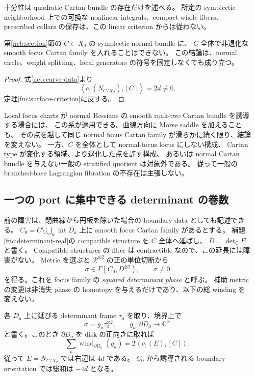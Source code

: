 十分性は quadratic Cartan bundle の存在だけを述べる。
所定の symplectic neighborhood 上での可換な nonlinear integrals、compact whole fibers、
prescribed collars の保存は、この linear criterion からは従わない。

\begin{corollary}\label{fnc:plane-section}
第\ref{ncb:section}節の $C\subset X_d$ の symplectic normal bundle に、
$C$ 全体で非退化な smooth focus Cartan family を入れることはできない。
この結論は、normal circle、weight splitting、local generators の符号を固定しなくても成り立つ。
\end{corollary}

\begin{proof}
式\eqref{ncb:curve-data}より
\[
 \left\langle c_1(N_{C/X_d}),[C]\right\rangle=2d\ne0.
\]
定理\ref{fnc:surface-criterion}に反する。
\end{proof}

Local focus charts が normal Hessians の smooth rank-two Cartan bundle を誘導する場合には、
この系が適用できる。曲線方向に Morse saddle を加えることも、
その点を越して同じ normal focus Cartan family が滑らかに続く限り、結論を変えない。
一方、$C$ を全体として normal-focus locus にしない構成、
Cartan type が変化する領域、より退化した点を許す構成、
あるいは normal Cartan bundle を与えない一般の stratified quotient は対象外である。
従って一般の branched-base Lagrangian fibration の不存在は主張しない。

\subsection{一つの port に集中できる determinant の巻数}

前の障害は、閉曲線から円板を除いた場合の boundary data としても記述できる。
$C_0=C\setminus\bigcup_a\operatorname{int}D_a$ 上に smooth focus Cartan family があるとする。
補題\ref{fnc:determinant-real}の compatible structure を $C$ 全体へ延ばし、
$D=\det_{\mathbb C}E$ と書く。
Compatible structures の fiber は contractible なので、この延長には障害がない。
Metric を選ぶと $\mathcal R^{\otimes2}$ の正の単位切断から
\[
 \sigma\in\Gamma(C_0,D^{\otimes2}),\qquad \sigma\ne0
\]
を得る。これを focus family の \emph{squared determinant phase} と呼ぶ。
補助 metric の変更は非消失 phase の homotopy を与えるだけであり、以下の総 winding を変えない。

\begin{proposition}\label{fnc:boundary-winding}
各 $D_a$ 上に延びる determinant frame $\tau_a$ を取り、境界上で
\[
 \sigma=g_a\tau_a^{\otimes2},\qquad g_a:\partial D_a\to\mathbb C^\times
\]
と書く。このとき $\partial D_a$ を disk の正向きに取れば
\begin{equation}\label{fnc:boundary-winding-equation}
 \sum_a\operatorname{wind}_{\partial D_a}(g_a)
 =2\left\langle c_1(E),[C]\right\rangle.
\end{equation}
従って $E=N_{C/X_d}$ では右辺は $4d$ である。
$C_0$ から誘導される boundary orientation では総和は $-4d$ となる。
\end{proposition}

